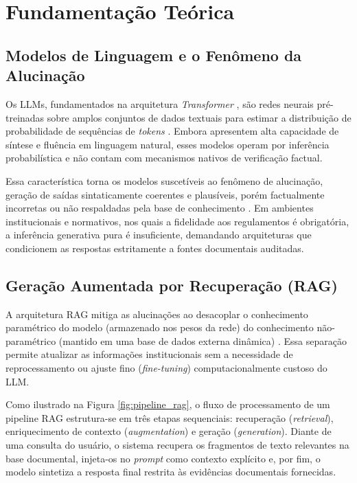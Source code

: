 \documentclass[12pt]{article}
\begin{document}
\FloatBarrier

\section{Fundamentação Teórica}\label{sec:fundamentacao}

\subsection{Modelos de Linguagem e o Fenômeno da Alucinação}

Os LLMs, fundamentados na arquitetura \textit{Transformer} \cite{vaswani2017attention}, são redes neurais pré-treinadas sobre amplos conjuntos de dados textuais para estimar a distribuição de probabilidade de sequências de \textit{tokens} \cite{zhao2023survey}. Embora apresentem alta capacidade de síntese e fluência em linguagem natural, esses modelos operam por inferência probabilística e não contam com mecanismos nativos de verificação factual.

Essa característica torna os modelos suscetíveis ao fenômeno de alucinação, geração de saídas sintaticamente coerentes e plausíveis, porém factualmente incorretas ou não respaldadas pela base de conhecimento \cite{ji2023survey}. Em ambientes institucionais e normativos, nos quais a fidelidade aos regulamentos é obrigatória, a inferência generativa pura é insuficiente, demandando arquiteturas que condicionem as respostas estritamente a fontes documentais auditadas.

\subsection{Geração Aumentada por Recuperação (RAG)}

A arquitetura RAG mitiga as alucinações ao desacoplar o conhecimento paramétrico do modelo (armazenado nos pesos da rede) do conhecimento não-paramétrico (mantido em uma base de dados externa dinâmica) \cite{lewis2020rag}. Essa separação permite atualizar as informações institucionais sem a necessidade de reprocessamento ou ajuste fino (\textit{fine-tuning}) computacionalmente custoso do LLM.

Como ilustrado na Figura \ref{fig:pipeline_rag}, o fluxo de processamento de um pipeline RAG estrutura-se em três etapas sequenciais: recuperação (\textit{retrieval}), enriquecimento de contexto (\textit{augmentation}) e geração (\textit{generation}). Diante de uma consulta do usuário, o sistema recupera os fragmentos de texto relevantes na base documental, injeta-os no \textit{prompt} como contexto explícito e, por fim, o modelo sintetiza a resposta final restrita às evidências documentais fornecidas.
\end{document}
